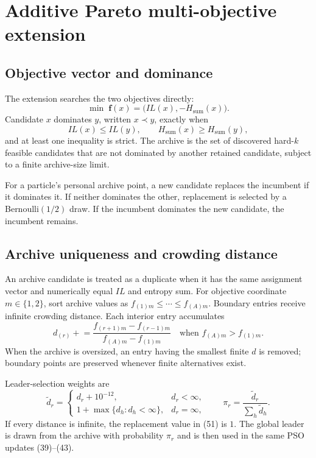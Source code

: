 \documentclass[11pt,a4paper]{article}
\begin{document}
\section{Additive Pareto multi-objective extension}

\subsection{Objective vector and dominance}

The extension searches the two objectives directly:
\begin{equation}
\min\;\mathbf f(x)=\bigl(IL(x),-H_{\mathrm{sum}}(x)\bigr).
\tag{48}
\end{equation}
Candidate $x$ dominates $y$, written $x\prec y$, exactly when
\begin{equation}
IL(x)\le IL(y),\qquad H_{\mathrm{sum}}(x)\ge H_{\mathrm{sum}}(y),
\tag{49}
\end{equation}
and at least one inequality is strict.  The archive is the set of discovered
hard-$k$ feasible candidates that are not dominated by another retained
candidate, subject to a finite archive-size limit.

For a particle's personal archive point, a new candidate replaces the
incumbent if it dominates it.  If neither dominates the other, replacement is
selected by a Bernoulli$(1/2)$ draw.  If the incumbent dominates the new
candidate, the incumbent remains.

\subsection{Archive uniqueness and crowding distance}

An archive candidate is treated as a duplicate when it has the same assignment
vector and numerically equal $IL$ and entropy sum.  For objective coordinate
$m\in\{1,2\}$, sort archive values as
$f_{(1)m}\le\cdots\le f_{(A)m}$.  Boundary entries receive infinite crowding
distance.  Each interior entry accumulates
\begin{equation}
d_{(r)}\mathrel{+}=
\frac{f_{(r+1)m}-f_{(r-1)m}}
{f_{(A)m}-f_{(1)m}}
\quad\text{when }f_{(A)m}>f_{(1)m}.
\tag{50}
\end{equation}
When the archive is oversized, an entry having the smallest finite $d$ is
removed; boundary points are preserved whenever finite alternatives exist.

Leader-selection weights are
\begin{equation}
\widetilde d_r=
\begin{cases}
d_r+10^{-12},&d_r<\infty,\\
1+\max\{d_h:d_h<\infty\},&d_r=\infty,
\end{cases}
\qquad
\pi_r=\frac{\widetilde d_r}{\sum_h\widetilde d_h}.
\tag{51}
\end{equation}
If every distance is infinite, the replacement value in (51) is $1$.  The
global leader is drawn from the archive with probability $\pi_r$ and is then
used in the same PSO updates (39)--(43).
\end{document}
